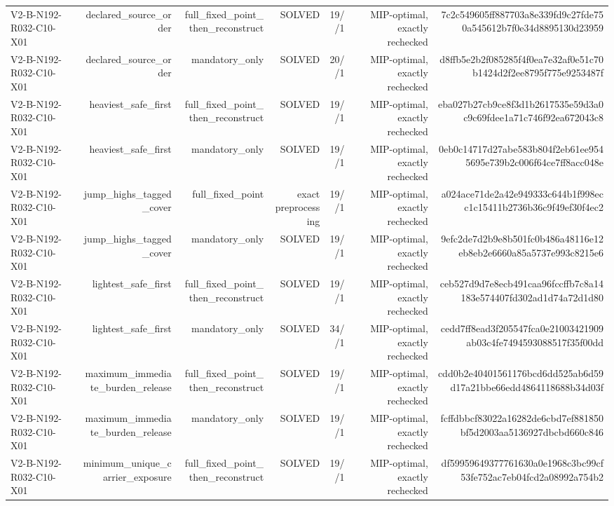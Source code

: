 {\begin{longtable}{lrrrrrr}
V2-B-N192-R032-C10-X01 & declared\_source\_order & full\_fixed\_point\_then\_reconstruct & SOLVED & 19//1 & MIP-optimal, exactly rechecked & 7c2c549605ff887703a8e339fd9c27fde750a545612b7f0e34d8895130d23959 \\
V2-B-N192-R032-C10-X01 & declared\_source\_order & mandatory\_only & SOLVED & 20//1 & MIP-optimal, exactly rechecked & d8ffb5e2b2f085285f4f0ea7e32af0e51c70b1424d2f2ee8795f775e9253487f \\
V2-B-N192-R032-C10-X01 & heaviest\_safe\_first & full\_fixed\_point\_then\_reconstruct & SOLVED & 19//1 & MIP-optimal, exactly rechecked & eba027b27cb9ce8f3d1b2617535e59d3a0c9c69fdee1a71c746f92ea672043c8 \\
V2-B-N192-R032-C10-X01 & heaviest\_safe\_first & mandatory\_only & SOLVED & 19//1 & MIP-optimal, exactly rechecked & 0eb0c14717d27abe583b804f2eb61ee9545695e739b2c006f64ce7ff8acc048e \\
V2-B-N192-R032-C10-X01 & jump\_highs\_tagged\_cover & full\_fixed\_point & exact preprocessing & 19//1 & MIP-optimal, exactly rechecked & a024ace71de2a42e949333c644b1f998ecc1c15411b2736b36c9f49ef30f4ec2 \\
V2-B-N192-R032-C10-X01 & jump\_highs\_tagged\_cover & mandatory\_only & SOLVED & 19//1 & MIP-optimal, exactly rechecked & 9efc2de7d2b9e8b501fc0b486a48116e12eb8eb2e6660a85a5737e993c8215e6 \\
V2-B-N192-R032-C10-X01 & lightest\_safe\_first & full\_fixed\_point\_then\_reconstruct & SOLVED & 19//1 & MIP-optimal, exactly rechecked & ceb527d9d7e8ecb491caa96fccffb7c8a14183e574407fd302ad1d74a72d1d80 \\
V2-B-N192-R032-C10-X01 & lightest\_safe\_first & mandatory\_only & SOLVED & 34//1 & MIP-optimal, exactly rechecked & cedd7ff8ead3f205547fca0e21003421909ab03c4fe7494593088517f35f00dd \\
V2-B-N192-R032-C10-X01 & maximum\_immediate\_burden\_release & full\_fixed\_point\_then\_reconstruct & SOLVED & 19//1 & MIP-optimal, exactly rechecked & cdd0b2e40401561176bcd6dd525ab6d59d17a21bbe66edd4864118688b34d03f \\
V2-B-N192-R032-C10-X01 & maximum\_immediate\_burden\_release & mandatory\_only & SOLVED & 19//1 & MIP-optimal, exactly rechecked & fcffdbbcf83022a16282de6cbd7ef881850bf5d2003aa5136927dbcbd660c846 \\
V2-B-N192-R032-C10-X01 & minimum\_unique\_carrier\_exposure & full\_fixed\_point\_then\_reconstruct & SOLVED & 19//1 & MIP-optimal, exactly rechecked & df59959649377761630a0e1968c3bc99cf53fe752ac7eb04fcd2a08992a754b2 \\

\end{longtable}}
